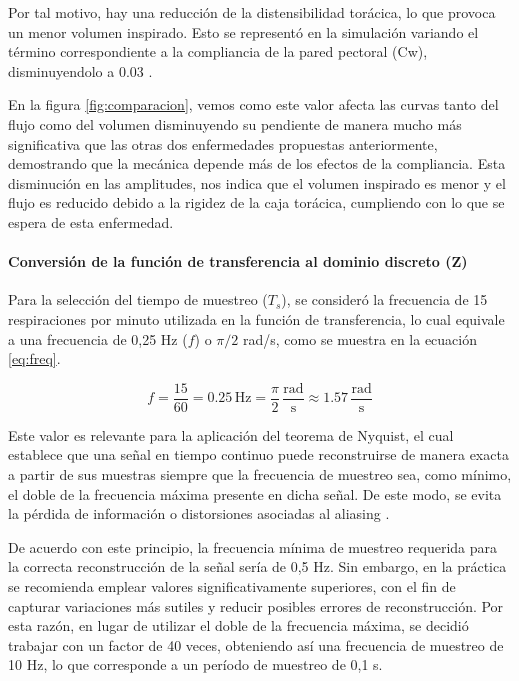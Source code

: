 \documentclass[journal]{IEEEtran}
\begin{document}
Por tal motivo, hay una reducción de la distensibilidad torácica, lo que provoca un menor volumen inspirado. Esto se representó en la simulación variando el término correspondiente a la compliancia de la pared pectoral (Cw), disminuyendolo a 0.03 \cite{nguyen2010respiratory}.

En la figura \ref{fig:comparacion}, vemos como este valor afecta las curvas tanto del flujo como del volumen disminuyendo su pendiente de manera mucho más significativa que las otras dos enfermedades propuestas anteriormente, demostrando que la mecánica depende más de los efectos de la compliancia. Esta disminución en las amplitudes, nos indica que el volumen inspirado es menor y el flujo es reducido debido a la rigidez de la caja torácica, cumpliendo con lo que se espera de esta enfermedad. \bigskip


\paragraph{Conversión de la función de transferencia al dominio discreto (Z)}

Para la selección del tiempo de muestreo ($T_s$), se consideró la frecuencia de 15 respiraciones por minuto utilizada en la función de transferencia, lo cual equivale a una frecuencia de 0,25 Hz ($f$) o $\pi/2$ rad/s, como se muestra en la ecuación \ref{eq:freq}.

\begin{equation}
    f = \frac{15}{60} = 0.25 \,\text{Hz} = \frac{\pi}{2} \,\frac{\text{rad}}{\text{s}} \approx 1.57 \,\frac{\text{rad}}{\text{s}}
    \label{eq:freq}
\end{equation}

Este valor es relevante para la aplicación del teorema de Nyquist, el cual establece que una señal en tiempo continuo puede reconstruirse de manera exacta a partir de sus muestras siempre que la frecuencia de muestreo sea, como mínimo, el doble de la frecuencia máxima presente en dicha señal. De este modo, se evita la pérdida de información o distorsiones asociadas al aliasing \cite{academialab2025nyquist}.

De acuerdo con este principio, la frecuencia mínima de muestreo requerida para la correcta reconstrucción de la señal sería de 0,5 Hz. Sin embargo, en la práctica se recomienda emplear valores significativamente superiores, con el fin de capturar variaciones más sutiles y reducir posibles errores de reconstrucción. Por esta razón, en lugar de utilizar el doble de la frecuencia máxima, se decidió trabajar con un factor de 40 veces, obteniendo así una frecuencia de muestreo de 10 Hz, lo que corresponde a un período de muestreo de 0,1 s.
\end{document}
